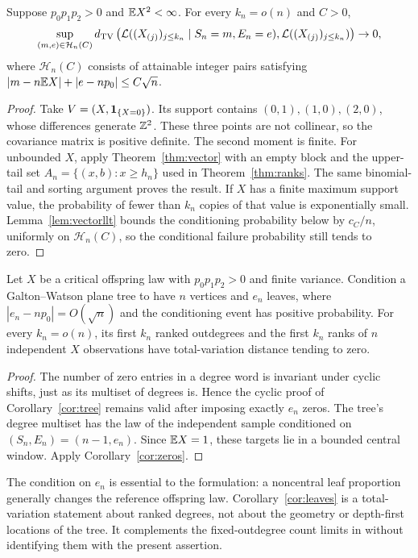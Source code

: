 \begin{corollary}\label{cor:zeros}
Suppose $p_0p_1p_2>0$ and $\mathbb E X^2<\infty$. For every $k_n=o(n)$ and $C>0$,
\[
 \sup_{(m,e)\in\mathcal H_n(C)}
 d_{\mathrm{TV}}\left(\mathcal L((X_{(j)})_{j\le k_n}\mid S_n=m,E_n=e),
           \mathcal L((X_{(j)})_{j\le k_n})\right)\to0,
\]
where $\mathcal H_n(C)$ consists of attainable integer pairs satisfying
$|m-n\mathbb E X|+|e-np_0|\le C\sqrt n$.
\end{corollary}
\begin{proof}
Take $V=(X,\mathbf 1_{\{X=0\}})$. Its support contains $(0,1),(1,0),(2,0)$, whose differences generate $\mathbb Z^2$. These three points are not collinear, so the covariance matrix is positive definite. The second moment is finite. For unbounded $X$, apply Theorem~\ref{thm:vector} with an empty block and the upper-tail set $A_n=\{(x,b):x\ge h_n\}$ used in Theorem~\ref{thm:ranks}. The same binomial-tail and sorting argument proves the result. If $X$ has a finite maximum support value, the probability of fewer than $k_n$ copies of that value is exponentially small. Lemma~\ref{lem:vectorllt} bounds the conditioning probability below by $c_C/n$, uniformly on $\mathcal H_n(C)$, so the conditional failure probability still tends to zero.
\end{proof}

\begin{corollary}\label{cor:leaves}
Let $X$ be a critical offspring law with $p_0p_1p_2>0$ and finite variance. Condition a Galton--Watson plane tree to have $n$ vertices and $e_n$ leaves, where $|e_n-np_0|=O(\sqrt n)$ and the conditioning event has positive probability. For every $k_n=o(n)$, its first $k_n$ ranked outdegrees and the first $k_n$ ranks of $n$ independent $X$ observations have total-variation distance tending to zero.
\end{corollary}
\begin{proof}
The number of zero entries in a degree word is invariant under cyclic shifts, just as its multiset of degrees is. Hence the cyclic proof of Corollary~\ref{cor:tree} remains valid after imposing exactly $e_n$ zeros. The tree's degree multiset has the law of the independent sample conditioned on $(S_n,E_n)=(n-1,e_n)$. Since $\mathbb E X=1$, these targets lie in a bounded central window. Apply Corollary~\ref{cor:zeros}.
\end{proof}

The condition on $e_n$ is essential to the formulation: a noncentral leaf proportion generally changes the reference offspring law. Corollary~\ref{cor:leaves} is a total-variation statement about ranked degrees, not about the geometry or depth-first locations of the tree. It complements the fixed-outdegree count limits in \cite{Thevenin} without identifying them with the present assertion.

